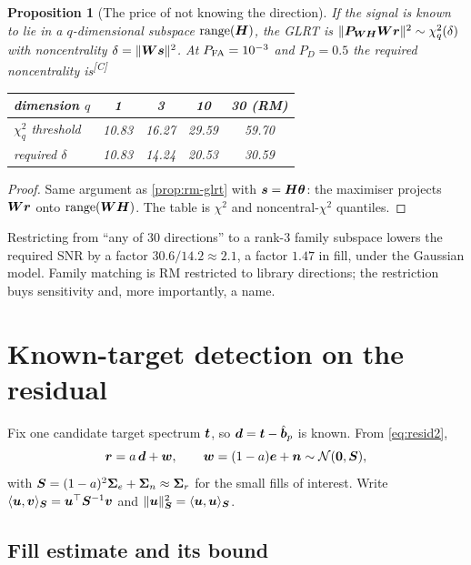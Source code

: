 \documentclass[11pt,a4paper]{article}
\theoremstyle{plain}
\newtheorem{proposition}{Proposition}[section]
\theoremstyle{definition}
\theoremstyle{remark}
\newcommand{\rng}{\operatorname{range}}
\newcommand{\bh}{\hat{\B{b}}}
\newcommand{\tv}{\B{t}}
\newcommand{\rv}{\B{r}}
\newcommand{\ev}{\B{e}}
\newcommand{\nv}{\B{n}}
\newcommand{\dv}{\B{d}}
\newcommand{\Sm}{\B{S}}
\newcommand{\Wm}{\B{W}}
\newcommand{\Hm}{\B{H}}
\newcommand{\Pm}{\B{P}}
\newcommand{\ip}[2]{\langle #1,#2\rangle_{\Sm}}
\newcommand{\nrm}[1]{\lVert #1\rVert}
\newcommand{\comp}{\textsuperscript{\textsf{\scriptsize[C]}}}
\begin{document}
\begin{proposition}[The price of not knowing the direction]
\label{prop:price}
If the signal is known to lie in a $q$-dimensional subspace $\rng(\Hm)$, the GLRT is
$\nrm{\Pm_{\Wm\Hm}\Wm\rv}^2\sim\chi^2_q(\delta)$ with noncentrality $\delta=\nrm{\Wm\B s}^2$. At
$P_{\rm FA}=10^{-3}$ and $P_D=0.5$ the required noncentrality is\comp
\begin{center}
\begin{tabular}{@{}lcccc@{}}
\toprule
dimension $q$ & 1 & 3 & 10 & 30 (RM)\\
\midrule
$\chi^2_q$ threshold & 10.83 & 16.27 & 29.59 & 59.70\\
required $\delta$ & 10.83 & 14.24 & 20.53 & 30.59\\
\bottomrule
\end{tabular}
\end{center}
\end{proposition}
\begin{proof}
Same argument as \cref{prop:rm-glrt} with $\B s=\Hm\B\theta$: the maximiser projects $\Wm\rv$ onto
$\rng(\Wm\Hm)$. The table is $\chi^2$ and noncentral-$\chi^2$ quantiles.
\end{proof}

Restricting from ``any of 30 directions'' to a rank-3 family subspace lowers the required SNR by a factor
$30.6/14.2\approx2.1$, a factor $1.47$ in fill, under the Gaussian model. Family matching is RM restricted to library
directions; the restriction buys sensitivity and, more importantly, a name.

\section{Known-target detection on the residual}
\label{sec:known}

Fix one candidate target spectrum $\tv$, so $\dv=\tv-\bh_p$ is known. From \eqref{eq:resid2},
\begin{equation}
  \rv=a\,\dv+\B w,\qquad \B w=(1-a)\ev+\nv\sim\mathcal N(\B 0,\Sm),
  \label{eq:lin}
\end{equation}
with $\Sm=(1-a)^2\B\Sigma_e+\B\Sigma_n\approx\B\Sigma_r$ for the small fills of interest. Write
$\ip{\B u}{\B v}=\B u^\top\Sm^{-1}\B v$ and $\nrm{\B u}_{\Sm}^2=\ip{\B u}{\B u}$.

\subsection{Fill estimate and its bound}
\end{document}
